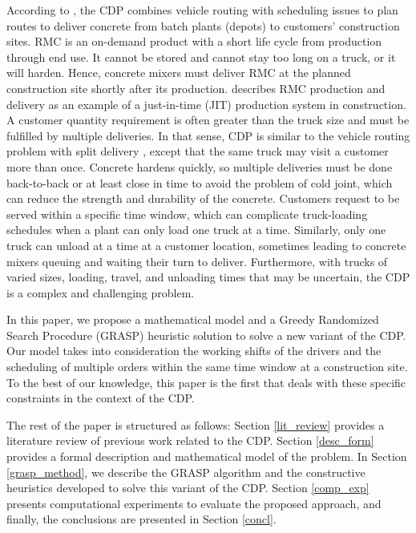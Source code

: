 \documentclass{article}
\begin{document}
According to \cite{blazewicz2019handbook}, the CDP combines vehicle routing with scheduling issues to plan routes to deliver concrete from batch plants (depots) to customers' construction sites. RMC is an on-demand product with a short life cycle from production through end use. It cannot be stored and cannot stay too long on a truck, or it will harden. Hence, concrete mixers must deliver RMC at the planned construction site shortly after its production. \cite{tommelein1999just} describes RMC production and delivery as an example of a just-in-time (JIT) production system in construction. A customer quantity requirement is often greater than the truck size and must be fulfilled by multiple deliveries. In that sense, CDP is similar to the vehicle routing problem with split delivery \citep{archetti2008split}, except that the same truck may visit a customer more than once. Concrete hardens quickly, so multiple deliveries must be done back-to-back or at least close in time to avoid the problem of cold joint, which can reduce the strength and durability of the concrete. Customers request to be served within a specific time window, which can complicate truck-loading schedules when a plant can only load one truck at a time. Similarly, only one truck can unload at a time at a customer location, sometimes leading to concrete mixers queuing and waiting their turn to deliver. Furthermore, with trucks of varied sizes, loading, travel, and unloading times that may be uncertain, the CDP is a complex and challenging problem. 

In this paper, we propose a mathematical model and a Greedy Randomized Search Procedure (GRASP) heuristic solution to solve a new variant of the CDP. Our model takes into consideration the working shifts of the drivers and the scheduling of multiple orders within the same time window at a construction site. To the best of our knowledge, this paper is the first that deals with these specific constraints in the context of the CDP.

The rest of the paper is structured as follows: Section \ref{lit_review} provides a literature review of previous work related to the CDP. Section \ref{desc_form} provides a formal description and mathematical model of the problem. In Section \ref{grasp_method}, we describe the GRASP algorithm and the constructive heuristics developed to solve this variant of the CDP. Section \ref{comp_exp}  presents computational experiments to evaluate the proposed approach, and finally, the conclusions are presented in Section \ref{concl}.
\end{document}
